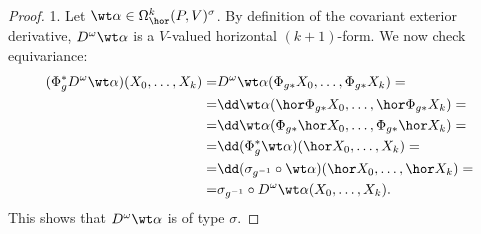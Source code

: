 \begin{proof}
    1. Let $\wt\alpha\in\Omega^k_{\hor}(P,V)^\sigma$. By definition of the covariant exterior derivative, $D^\omega\wt\alpha$ is a $V$-valued horizontal $(k+1)$-form. We now check equivariance:
    \begin{align}
        (\Phi_g^\ast D^\omega\wt\alpha)(X_0,\ldots,X_k)=&D^\omega\wt\alpha(\Phi_{g\ast}X_0,\ldots, \Phi_{g\ast}X_k)=\\
        =&\dd\wt\alpha(\hor\Phi_{g\ast}X_0,\ldots,\hor \Phi_{g\ast}X_k)=\\
        =&\dd\wt\alpha(\Phi_{g\ast}\hor X_0,\ldots,\Phi_{g\ast}\hor X_k)=\\
        =&\dd(\Phi_g^\ast\wt\alpha)(\hor X_0,\ldots,X_k)=\\
        =&\dd(\sigma_{g^{-1}}\circ\wt\alpha)(\hor X_0,\ldots,\hor X_k)=\\
        =&\sigma_{g^{-1}}\circ D^\omega\wt\alpha (X_0,\ldots,X_k).
    \end{align}
    This shows that $D^\omega\wt\alpha$ is of type $\sigma$.


\end{proof}
